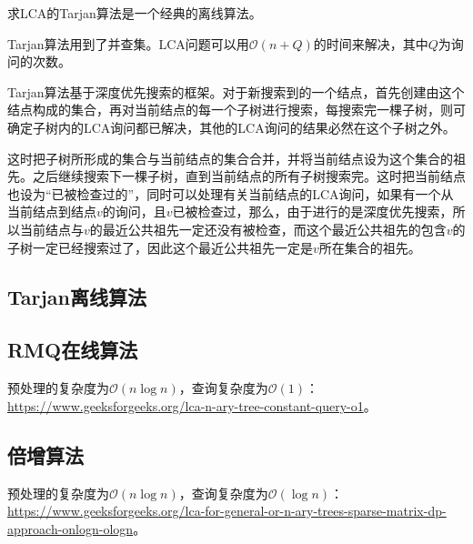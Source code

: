 求LCA的Tarjan算法是一个经典的离线算法。

Tarjan算法用到了并查集。LCA问题可以用$\mathcal{O}(n+Q)$的时间来解决，其中$Q$为询问的次数。

Tarjan算法基于深度优先搜索的框架。对于新搜索到的一个结点，首先创建由这个结点构成的集合，再对当前结点的每一个子树进行搜索，每搜索完一棵子树，则可确定子树内的LCA询问都已解决，其他的LCA询问的结果必然在这个子树之外。

这时把子树所形成的集合与当前结点的集合合并，并将当前结点设为这个集合的祖先。之后继续搜索下一棵子树，直到当前结点的所有子树搜索完。这时把当前结点也设为“已被检查过的”，同时可以处理有关当前结点的LCA询问，如果有一个从当前结点到结点$v$的询问，且$v$已被检查过，那么，由于进行的是深度优先搜索，所以当前结点与$v$的最近公共祖先一定还没有被检查，而这个最近公共祖先的包含$v$的子树一定已经搜索过了，因此这个最近公共祖先一定是$v$所在集合的祖先。

\subsection{Tarjan离线算法}



\subsection{RMQ在线算法}

预处理的复杂度为$\mathcal{O}(n\log n)$，查询复杂度为$\mathcal{O}(1)$：\href{https://www.geeksforgeeks.org/lca-n-ary-tree-constant-query-o1}{https://www.geeksforgeeks.org/lca-n-ary-tree-constant-query-o1}。



\subsection{倍增算法}

预处理的复杂度为$\mathcal{O}(n\log n)$，查询复杂度为$\mathcal{O}(\log n)$：\href{https://www.geeksforgeeks.org/lca-for-general-or-n-ary-trees-sparse-matrix-dp-approach-onlogn-ologn}{https://www.geeksforgeeks.org/lca-for-general-or-n-ary-trees-sparse-matrix-dp-approach-onlogn-ologn}。


